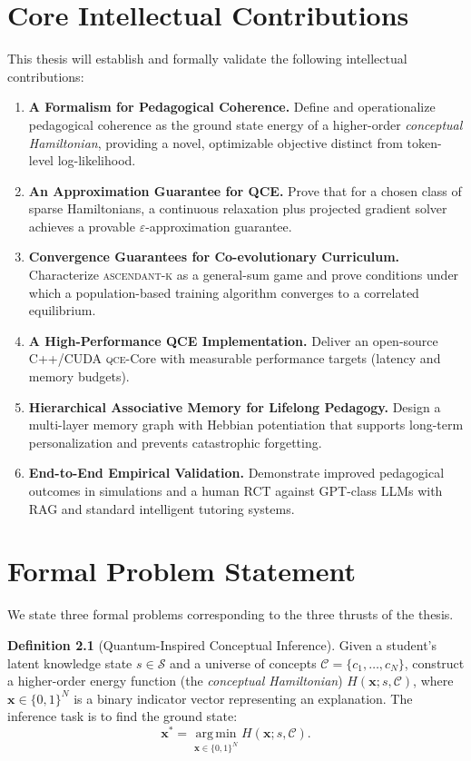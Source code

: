 \documentclass[12pt,oneside]{report}
\newcommand{\argmin}{\operatorname*{arg\,min}}
\newcommand{\framework}[1]{\textsc{#1}}
\newcommand{\qce}{\framework{qce}}
\newcommand{\ascendantk}{\framework{ascendant-k}}
\theoremstyle{definition}
\newtheorem{definition}{Definition}[chapter]
\theoremstyle{plain}
\theoremstyle{remark}
\begin{document}
\chapter{Core Intellectual Contributions}
This thesis will establish and formally validate the following intellectual contributions:

\begin{enumerate}[leftmargin=*, itemsep=2pt]
  \item \textbf{A Formalism for Pedagogical Coherence.} Define and operationalize pedagogical coherence as the ground state energy of a higher-order \emph{conceptual Hamiltonian}, providing a novel, optimizable objective distinct from token-level log-likelihood.
  \item \textbf{An Approximation Guarantee for QCE.} Prove that for a chosen class of sparse Hamiltonians, a continuous relaxation plus projected gradient solver achieves a provable $\varepsilon$-approximation guarantee.
  \item \textbf{Convergence Guarantees for Co-evolutionary Curriculum.} Characterize \ascendantk{} as a general-sum game and prove conditions under which a population-based training algorithm converges to a correlated equilibrium.
  \item \textbf{A High-Performance QCE Implementation.} Deliver an open-source C++/CUDA \qce{}-Core with measurable performance targets (latency and memory budgets).
  \item \textbf{Hierarchical Associative Memory for Lifelong Pedagogy.} Design a multi-layer memory graph with Hebbian potentiation that supports long-term personalization and prevents catastrophic forgetting.
  \item \textbf{End-to-End Empirical Validation.} Demonstrate improved pedagogical outcomes in simulations and a human RCT against GPT-class LLMs with RAG and standard intelligent tutoring systems.
\end{enumerate}

\chapter{Formal Problem Statement}
We state three formal problems corresponding to the three thrusts of the thesis.

\begin{definition}[Quantum-Inspired Conceptual Inference]
Given a student's latent knowledge state $s \in \mathcal{S}$ and a universe of concepts $\mathcal{C}=\{c_1,\ldots,c_N\}$, construct a higher-order energy function (the \emph{conceptual Hamiltonian}) $H(\bm{x}; s, \mathcal{C})$, where $\bm{x} \in \{0,1\}^{N}$ is a binary indicator vector representing an explanation. The inference task is to find the ground state:
\[
\bm{x}^\ast = \argmin_{\bm{x}\in\{0,1\}^N} H(\bm{x}; s, \mathcal{C}).
\]
\end{definition}
\end{document}
